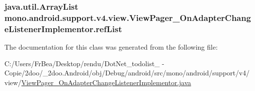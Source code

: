 \hypertarget{classmono_1_1android_1_1support_1_1v4_1_1view_1_1_view_pager___on_adapter_change_listener_implementor_99e4dba7dd3e83fbfdeecd8c81ebfd83}{
\subsubsection[{refList}]{\setlength{\rightskip}{0pt plus 5cm}java.util.ArrayList {\bf mono.android.support.v4.view.ViewPager\_\-OnAdapterChangeListenerImplementor.refList}}}
\label{classmono_1_1android_1_1support_1_1v4_1_1view_1_1_view_pager___on_adapter_change_listener_implementor_99e4dba7dd3e83fbfdeecd8c81ebfd83}




The documentation for this class was generated from the following file:\begin{CompactItemize}
\item 
C:/Users/FrBea/Desktop/rendu/DotNet\_\-todolist\_ - Copie/2doo/\_\-2doo.Android/obj/Debug/android/src/mono/android/support/v4/view/\hyperlink{_view_pager___on_adapter_change_listener_implementor_8java}{ViewPager\_\-OnAdapterChangeListenerImplementor.java}\end{CompactItemize}
